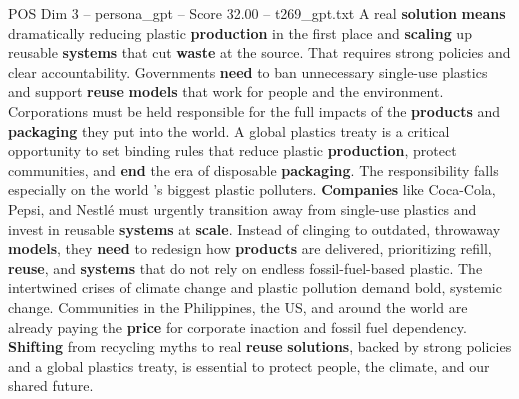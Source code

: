 \begin{textsample}{POS Dim 3 – persona\_gpt – Score 32.00 – t269\_gpt.txt}
A real \textbf{solution} \textbf{means} dramatically reducing plastic \textbf{production} in the first place and \textbf{scaling} up reusable \textbf{systems} that cut \textbf{waste} at the source.
That requires strong policies and clear accountability.
Governments \textbf{need} to ban unnecessary single-use plastics and support \textbf{reuse} \textbf{models} that work for people and the environment.
Corporations must be held responsible for the full impacts of the \textbf{products} and \textbf{packaging} they put into the world.
A global plastics treaty is a critical opportunity to set binding rules that reduce plastic \textbf{production}, protect communities, and \textbf{end} the era of disposable \textbf{packaging}.
The responsibility falls especially on the world ’s biggest plastic polluters. \textbf{Companies} like Coca-Cola, Pepsi, and Nestlé must urgently transition away from single-use plastics and invest in reusable \textbf{systems} at \textbf{scale}.
Instead of clinging to outdated, throwaway \textbf{models}, they \textbf{need} to redesign how \textbf{products} are delivered, prioritizing refill, \textbf{reuse}, and \textbf{systems} that do not rely on endless fossil-fuel-based plastic.
The intertwined crises of climate change and plastic pollution demand bold, systemic change.
Communities in the Philippines, the US, and around the world are already paying the \textbf{price} for corporate inaction and fossil fuel dependency. \textbf{Shifting} from recycling myths to real \textbf{reuse} \textbf{solutions}, backed by strong policies and a global plastics treaty, is essential to protect people, the climate, and our shared future.

\end{textsample}
